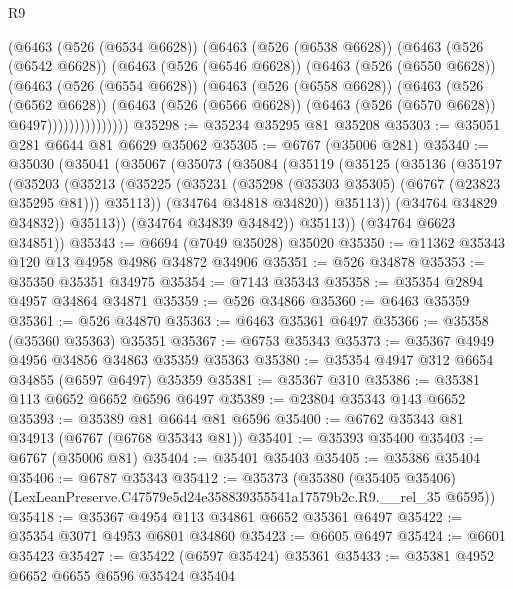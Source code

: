 \begin{lexlean}{R9}
\begin{coremodule}
              (@6463
                (@526 (@6534 @6628))
                (@6463
                  (@526 (@6538 @6628))
                  (@6463
                    (@526 (@6542 @6628))
                    (@6463
                      (@526 (@6546 @6628))
                      (@6463
                        (@526 (@6550 @6628))
                        (@6463
                          (@526 (@6554 @6628))
                          (@6463
                            (@526 (@6558 @6628))
                            (@6463
                              (@526 (@6562 @6628))
                              (@6463
                                (@526 (@6566 @6628))
                                (@6463 (@526 (@6570 @6628)) @6497)))))))))))))))
@35298 := @35234 @35295 @81 @35208
@35303 := @35051 @281 @6644 @81 @6629 @35062
@35305 := @6767 (@35006 @281)
@35340 := @35030
    (@35041
      (@35067
        (@35073
          (@35084
            (@35119
              (@35125
                (@35136
                  (@35197
                    (@35203
                      (@35213
                        (@35225
                          (@35231 (@35298 (@35303 @35305) (@6767 (@23823 @35295 @81))) @35113))
                        (@34764 @34818 @34820))
                      @35113))
                  (@34764 @34829 @34832))
                @35113))
            (@34764 @34839 @34842))
          @35113))
      (@34764 @6623 @34851))
@35343 := @6694 (@7049 @35028) @35020
@35350 := @11362 @35343 @120 @13 @4958 @4986 @34872 @34906
@35351 := @526 @34878
@35353 := @35350 @35351 @34975
@35354 := @7143 @35343
@35358 := @35354 @2894 @4957 @34864 @34871
@35359 := @526 @34866
@35360 := @6463 @35359
@35361 := @526 @34870
@35363 := @6463 @35361 @6497
@35366 := @35358 (@35360 @35363) @35351
@35367 := @6753 @35343
@35373 := @35367 @4949 @4956 @34856 @34863 @35359 @35363
@35380 := @35354 @4947 @312 @6654 @34855 (@6597 @6497) @35359
@35381 := @35367 @310
@35386 := @35381 @113 @6652 @6652 @6596 @6497
@35389 := @23804 @35343 @143 @6652
@35393 := @35389 @81 @6644 @81 @6596
@35400 := @6762 @35343 @81 @34913 (@6767 (@6768 @35343 @81))
@35401 := @35393 @35400
@35403 := @6767 (@35006 @81)
@35404 := @35401 @35403
@35405 := @35386 @35404
@35406 := @6787 @35343
@35412 := @35373
    (@35380 (@35405 @35406) (LexLeanPreserve.C47579e5d24e358839355541a17579b2c.R9.__rel_35 @6595))
@35418 := @35367 @4954 @113 @34861 @6652 @35361 @6497
@35422 := @35354 @3071 @4953 @6801 @34860
@35423 := @6605 @6497
@35424 := @6601 @35423
@35427 := @35422 (@6597 @35424) @35361
@35433 := @35381 @4952 @6652 @6655 @6596 @35424 @35404

\end{coremodule}
\end{lexlean}
